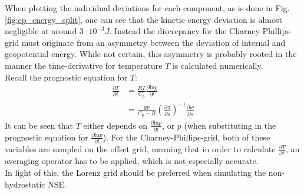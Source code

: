 When plotting the individual deviations for each component, as is done in Fig. \ref{fig:cp_energy_split}, one can see that the kinetic energy deviation is almost negligible at around $3\cdot10^{-3}J$.
Instead the discrepancy for the Charney-Phillips-grid must originate from an asymmetry between the deviation of internal and geopotential energy.
While not certain, this asymmetry is probably rooted in the manner the time-derivative for temperature $T$ is calculated numerically.\\
Recall the prognostic equation for $T$:
\begin{align*}
\frac{\partial T}{\partial t} &= \frac{RT}{C_p}\frac{\partial \text{ln}p}{\partial t}\\
&=\frac{gp}{C_p-R}\left(\frac{\partial \pi}{\partial s}\right)^{-1} \frac{\partial w}{\partial s}
\end{align*}
It can be seen that $T$ either depends on $\frac{\partial \text{ln}p}{\partial t}$, or $p$ (when substituting in the prognostic equation for $\frac{\partial \text{ln}p}{\partial t}$).
For the Charney-Phillips-grid, both of these variables are sampled on the offset grid, meaning that in order to calculate $\frac{\partial T}{\partial t}$, an averaging operator has to be applied, which is not especially accurate.\\
In light of this, the Lorenz grid should be preferred when simulating the non-hydrostatic NSE.

